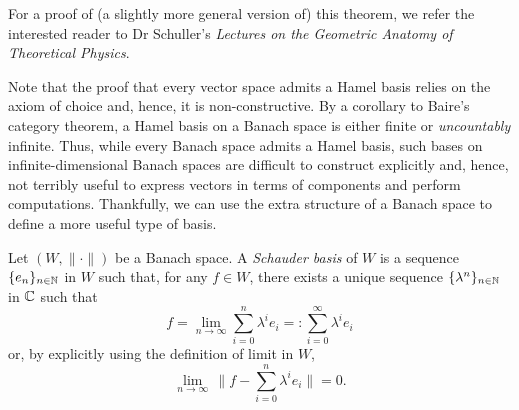 For a proof of (a slightly more general version of) this theorem, we
refer the interested reader to Dr Schuller's \emph{Lectures on the
Geometric Anatomy of Theoretical Physics}.
\medskip


Note that the proof that every vector space admits a Hamel basis
relies on the axiom of choice and, hence, it is non-constructive. By a
corollary to Baire's category theorem, a Hamel basis on a Banach space
is either finite or \emph{uncountably} infinite. Thus, while every
Banach space admits a Hamel basis, such bases on infinite-dimensional
Banach spaces are difficult to construct explicitly and, hence, not
terribly useful to express vectors in terms of components and perform
computations. Thankfully, we can use the extra structure of a Banach
space to define a more useful type of basis.

\begin{definition}
Let $(W,\|\cdot\|)$ be a Banach space. A \emph{Schauder
basis} of $W$ is a sequence $\{e_n\}_{n\in \mathbb{N}}$
in $W$ such that, for any $f\in W$, there exists a unique sequence
$\{\lambda^n\}_{n\in \mathbb{N}}$ in $\mathbb{C}$ such that
\begin{equation*}
f = \lim_{n\to \infty} \sum_{i=0}^n\lambda^ie_i =: \sum_{i=0}^{\infty}\lambda^ie_i
\end{equation*}
or, by explicitly using the definition of limit in $W$,
\begin{equation*}
\lim_{n\to \infty} \, \biggl\|f-\sum_{i=0}^n\lambda^ie_i\biggr\| = 0.
\end{equation*}
\end{definition}

